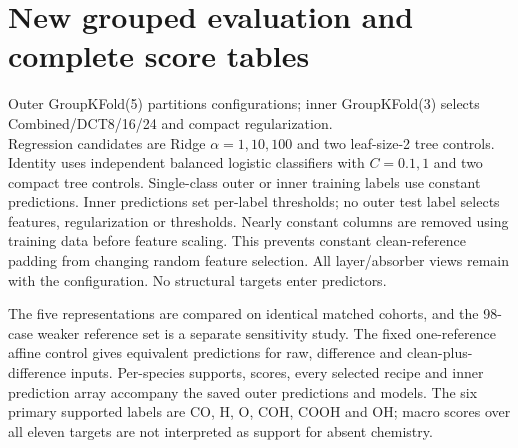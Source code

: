 \documentclass[11pt,a4paper]{article}
\begin{document}
\section{New grouped evaluation and complete score tables}
\begin{sloppypar}
Outer GroupKFold(5) partitions configurations; inner GroupKFold(3) selects Combined/DCT8/16/24 and compact regularization.\\ Regression candidates are Ridge $\alpha=1,10,100$ and two leaf-size-2 tree controls. Identity uses independent balanced logistic classifiers with $C=0.1,1$ and two compact tree controls. Single-class outer or inner training labels use constant predictions. Inner predictions set per-label thresholds; no outer test label selects features, regularization or thresholds. Nearly constant columns are removed using training data before feature scaling. This prevents constant clean-reference padding from changing random feature selection. All layer/absorber views remain with the configuration. No structural targets enter predictors.
\end{sloppypar}

The five representations are compared on identical matched cohorts, and the 98-case weaker reference set is a separate sensitivity study. The fixed one-reference affine control gives equivalent predictions for raw, difference and clean-plus-difference inputs. Per-species supports, scores, every selected recipe and inner prediction array accompany the saved outer predictions and models. The six primary supported labels are CO, H, O, COH, COOH and OH; macro scores over all eleven targets are not interpreted as support for absent chemistry.
\end{document}
